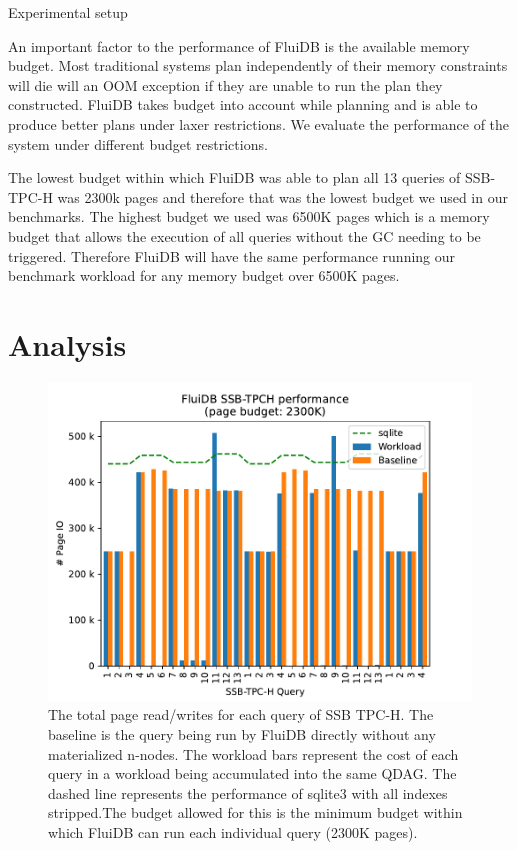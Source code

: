 \begin{corrected}{Experimental setup}

  An important factor to the performance of FluiDB is the available
  memory budget. Most traditional systems plan independently of their
  memory constraints will die will an OOM exception if they are unable
  to run the plan they constructed. FluiDB takes budget into account
  while planning and is able to produce better plans under laxer
  restrictions. We evaluate the performance of the system under
  different budget restrictions.

  The lowest budget within which FluiDB was able to plan all 13
  queries of SSB-TPC-H was 2300k pages and therefore that was the
  lowest budget we used in our benchmarks. The highest budget we used
  was 6500K pages which is a memory budget that allows the execution
  of all queries without the GC needing to be triggered. Therefore
  FluiDB will have the same performance running our benchmark workload
  for any memory budget over 6500K pages.
\end{corrected}

\section{Analysis}
\newcommand{\ioperfdescr}{The total page read/writes for each query of
  SSB TPC-H. The baseline is the query being run by FluiDB directly
  without any materialized n-nodes. The workload bars represent the
  cost of each query in a workload being accumulated into the same
  QDAG. The dashed line represents the performance of sqlite3 with all
  indexes stripped.}
\begin{figure}[H]
  \centering
  \includegraphics[width=.9\linewidth]{./plans/workload_2300K.pdf}
  \caption{\label{fig:min_budget_plot} \ioperfdescr The budget allowed
    for this is the minimum budget within which FluiDB can run each
    individual query (2300K pages).}
\end{figure}

